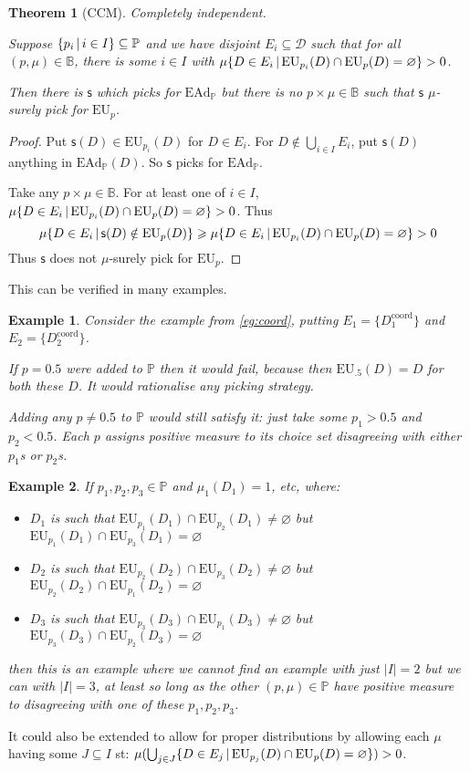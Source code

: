 \documentclass[a4paper]{article}
\newtheorem{theorem}{Theorem}
\newtheorem{example}{Example}
\renewcommand\P{\mathbb{P}} %
\newcommand\EU{\mathrm{EU}}
\newcommand\EAd{\mathrm{EAd}}
\newcommand{\Decs}{\mathcal{D}}
\newcommand\s{\mathsf{s}}
\newcommand{\IB}{\mathbb{B}}
\newcommand{\IP}{\P}
\newcommand\SetDelimiter[1][]{
	\nonscript\,#1\vert \allowbreak \nonscript\,\mathopen{}}
\providecommand\given{\SetDelimiter}
\renewcommand{\emptyset}{\varnothing}
\renewcommand{\geq}{\geqslant}
\newenvironment{CCM rewritten}
{\begingroup\color{blue}} %
{\endgroup}              %
\begin{document}
\begin{theorem}[CCM]\label{thm:ead-existsimpermissible[indep]:CCM-1}
	Completely independent. 
	
	Suppose $\{p_i\given i\in I\}\subseteq \IP$ and we have disjoint $E_i\subseteq\Decs$ such that for all $(p,\mu)\in\IB$, there is some $i\in I$ with
	 $\mu\{D\in E_i\given \EU_{p_i}(D)\cap \EU_p(D)= \emptyset\}>0$.
	
	Then there is $\s$ which picks for $\EAd_\IP$ but there is no $p\times\mu\in \IB$ such that $\s$ $\mu$-surely pick for $\EU_p$.
\end{theorem}
\begin{proof}
	
	Put $\s(D)\in\EU_{p_i}(D)$ for $D\in E_i$. For $D\notin\bigcup_{i\in I}E_i$, put $\s(D)$ anything in $\EAd_\IP(D)$.  So $\s$ picks for $\EAd_\IP$. 
	
	Take any $p\times\mu\in\IB$. For at least one of $i\in I$, 	 $\mu\{D\in E_i\given \EU_{p_i}(D)\cap \EU_p(D)= \emptyset\}>0$. Thus
	 \begin{equation}
		\mu\{D\in E_i\given \s(D)\notin\EU_p(D)\}\geq\mu\{D\in E_i\given \EU_{p_i}(D)\cap \EU_p(D)= \emptyset\}>0
	\end{equation}
	Thus $\s$ does not $\mu$-surely pick for $\EU_p$.
\end{proof}
This can be verified in many examples. 

\begin{example}
	Consider the example from \cref{eg:coord}, putting $E_1=\{D^{\mathrm{coord}}_1\}$ and $E_2=\{D^{\mathrm{coord}}_2\}$. 
	
	If $p=0.5$ were added to $\IP$ then it would fail, because then $\EU_{.5}(D)=D$ for both these $D$. It would rationalise any picking strategy. 
	
	Adding any $p\neq 0.5$ to $\IP$ would still satisfy it: just take some $p_1>0.5$ and $p_2<0.5$. Each $p$ assigns positive measure to its choice set disagreeing with either $p_1$s or $p_2$s. 
\end{example}
\begin{example}
	If $p_1,p_2,p_3\in\IP$ and $\mu_1(D_1)=1$, etc, where:
	\begin{itemize}
		\item $D_1$ is such that $\EU_{p_1}(D_1)\cap\EU_{p_2}(D_1)\neq \emptyset$ but $\EU_{p_1}(D_1)\cap\EU_{p_3}(D_1)= \emptyset$
		\item $D_2$ is such that $\EU_{p_2}(D_2)\cap\EU_{p_3}(D_2)\neq \emptyset$ but $\EU_{p_2}(D_2)\cap\EU_{p_1}(D_2)= \emptyset$
		\item $D_3$ is such that $\EU_{p_3}(D_3)\cap\EU_{p_1}(D_3)\neq \emptyset$ but $\EU_{p_3}(D_3)\cap\EU_{p_2}(D_3)= \emptyset$
	\end{itemize}then this is an example where we cannot find an example with just $|I|=2$ but we can with $|I|=3$, at least so long as the other $(p,\mu)\in\IP$ have positive measure to disagreeing with one of these $p_1,p_2,p_3$. 
\end{example}
It could also be extended to allow for proper distributions by allowing each $\mu$ having some $J\subseteq I$ st:  $\mu(\bigcup_{j\in J}\{D\in E_j\given \EU_{p_j}(D)\cap \EU_p(D)= \emptyset\})>0$.
\end{document}
